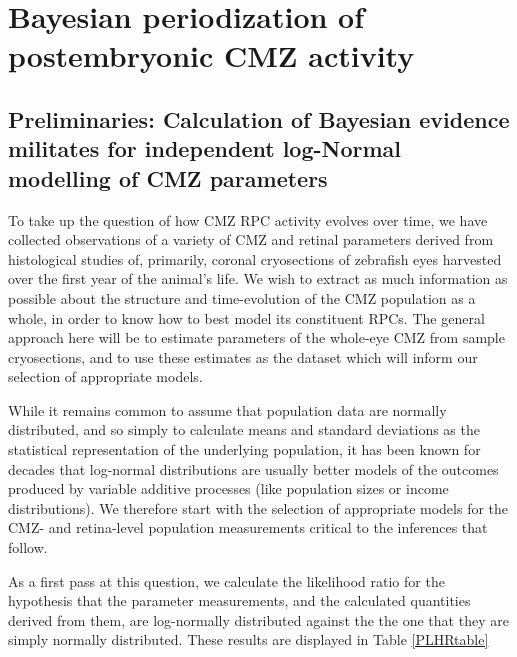 \chapter{Bayesian periodization of postembryonic CMZ activity}
\label{chap:CMZ}

\section{Preliminaries: Calculation of Bayesian evidence militates for independent log-Normal modelling of CMZ parameters}
To take up the question of how CMZ RPC activity evolves over time, we have collected observations of a variety of CMZ and retinal parameters derived from histological studies of, primarily, coronal cryosections of zebrafish eyes harvested over the first year of the animal's life. We wish to extract as much information as possible about the structure and time-evolution of the CMZ population as a whole, in order to know how to best model its constituent RPCs. The general approach here will be to estimate parameters of the whole-eye CMZ from sample cryosections, and to use these estimates as the dataset which will inform our selection of appropriate models.

While it remains common to assume that population data are normally distributed, and so simply to calculate means and standard deviations as the statistical representation of the underlying population, it has been known for decades \cite{Heath1967} that log-normal distributions are usually better models of the outcomes produced by variable additive processes (like population sizes or income distributions). We therefore start with the selection of appropriate models for the CMZ- and retina-level population measurements critical to the inferences that follow.

As a first pass at this question, we calculate the likelihood ratio for the hypothesis that the parameter measurements, and the calculated quantities derived from them, are log-normally distributed against the the one that they are simply normally distributed. These results are displayed in Table \ref{PLHRtable}

